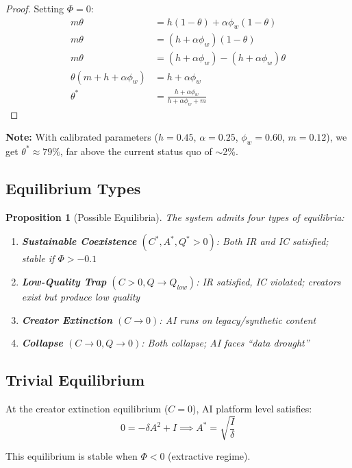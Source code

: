 \documentclass[11pt,a4paper]{article}
\newtheorem{proposition}{Proposition}
\begin{document}
\begin{proof}
Setting $\Phi = 0$:
\begin{align}
m\theta &= h(1-\theta) + \alpha\phi_w(1-\theta)\\
m\theta &= (h + \alpha\phi_w)(1-\theta)\\
m\theta &= (h + \alpha\phi_w) - (h + \alpha\phi_w)\theta\\
\theta(m + h + \alpha\phi_w) &= h + \alpha\phi_w\\
\theta^* &= \frac{h + \alpha\phi_w}{h + \alpha\phi_w + m}
\end{align}
\end{proof}

\textbf{Note:} With calibrated parameters ($h=0.45$, $\alpha=0.25$, $\phi_w=0.60$, $m=0.12$), we get $\theta^* \approx 79\%$, far above the current status quo of $\sim$2\%.

\subsection{Equilibrium Types}

\begin{proposition}[Possible Equilibria]
The system admits four types of equilibria:
\begin{enumerate}
\item \textbf{Sustainable Coexistence} $(C^*, A^*, Q^* > 0)$: Both IR and IC satisfied; stable if $\Phi > -0.1$
\item \textbf{Low-Quality Trap} $(C > 0, Q \to Q_{low})$: IR satisfied, IC violated; creators exist but produce low quality
\item \textbf{Creator Extinction} $(C \to 0)$: AI runs on legacy/synthetic content
\item \textbf{Collapse} $(C \to 0, Q \to 0)$: Both collapse; AI faces ``data drought''
\end{enumerate}
\end{proposition}

\subsection{Trivial Equilibrium}

At the creator extinction equilibrium ($C = 0$), AI platform level satisfies:
\begin{equation}
0 = -\delta A^2 + I \implies A^* = \sqrt{\frac{I}{\delta}}
\end{equation}

This equilibrium is stable when $\Phi < 0$ (extractive regime).
\end{document}
